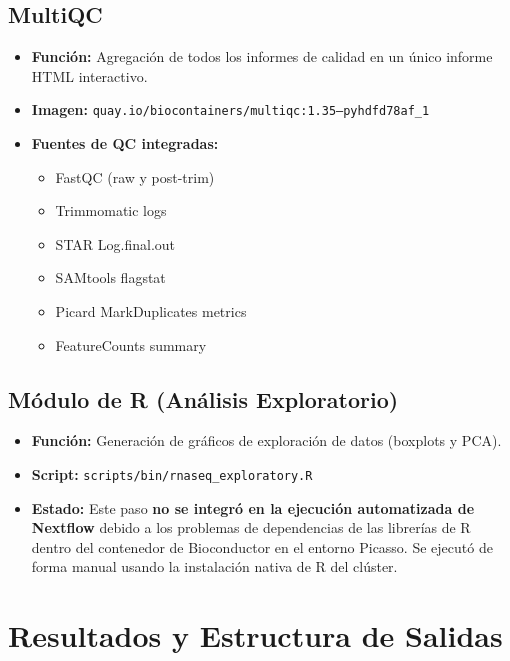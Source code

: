 \documentclass[11pt,a4paper]{article}
\begin{document}
\subsection{MultiQC}
\begin{itemize}
    \item \textbf{Función:} Agregación de todos los informes de calidad en un único informe HTML interactivo.
    \item \textbf{Imagen:} \texttt{quay.io/biocontainers/multiqc:1.35--pyhdfd78af\_1}
    \item \textbf{Fuentes de QC integradas:}
    \begin{itemize}
        \item FastQC (raw y post-trim)
        \item Trimmomatic logs
        \item STAR Log.final.out
        \item SAMtools flagstat
        \item Picard MarkDuplicates metrics
        \item FeatureCounts summary
    \end{itemize}
\end{itemize}

\subsection{Módulo de R (Análisis Exploratorio)}
\begin{itemize}
    \item \textbf{Función:} Generación de gráficos de exploración de datos (boxplots y PCA).
    \item \textbf{Script:} \texttt{scripts/bin/rnaseq\_exploratory.R}
    \item \textbf{Estado:} Este paso \textbf{no se integró en la ejecución automatizada de Nextflow} debido a los problemas de dependencias de las librerías de R dentro del contenedor de Bioconductor en el entorno Picasso. Se ejecutó de forma manual usando la instalación nativa de R del clúster.
\end{itemize}

\section{Resultados y Estructura de Salidas}
\label{sec:resultados}
\end{document}
